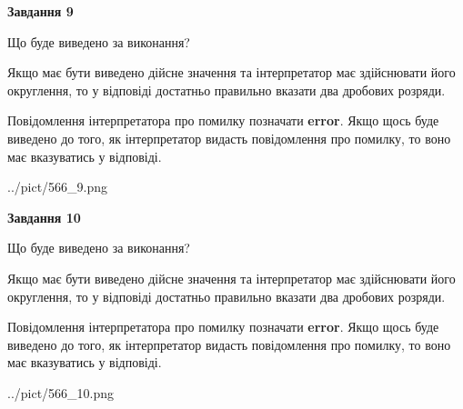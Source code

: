 \documentclass[12pt, ukrainian]{article}
\begin{document}
{\begin {Large}
{\begin {center}\textbf{Завдання 9}\end {center}}\par
Що буде виведено за виконання? \par

Якщо має бути виведено дійсне значення та інтерпретатор має здійснювати його округлення, 
то у відповіді достатньо правильно вказати два дробових розряди.

Повідомлення інтерпретатора про помилку позначати \textbf{error}.
Якщо щось буде виведено до того, як інтерпретатор видасть повідомлення про помилку, 
то воно має вказуватись у відповіді. \par

\begin{center}
	{../pict/566_9.png}
\end{center}
\newpage

{\begin {center}\textbf{Завдання 10}\end {center}}\par
Що буде виведено за виконання? \par

Якщо має бути виведено дійсне значення та інтерпретатор має здійснювати його округлення, 
то у відповіді достатньо правильно вказати два дробових розряди.

Повідомлення інтерпретатора про помилку позначати \textbf{error}.
Якщо щось буде виведено до того, як інтерпретатор видасть повідомлення про помилку, 
то воно має вказуватись у відповіді. \par

\begin{center}
	{../pict/566_10.png}
\end{center}
\newpage

\end {Large}}
\end{document}
